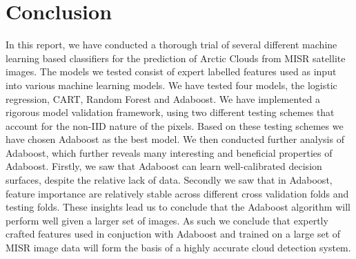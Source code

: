 \documentclass[11pt, letterpaper, journal]{IEEEtran}
\begin{document}
\section{Conclusion}
In this report, we have conducted a thorough trial of several different machine learning based classifiers for the prediction of Arctic Clouds from MISR satellite images. The models we tested consist of expert labelled features used as input into various machine learning models. We have tested four models, the logistic regression, CART, Random Forest and Adaboost. We have implemented a rigorous model validation framework, using two different testing schemes that account for the non-IID nature of the pixels. Based on these testing schemes we have chosen Adaboost as the best model. We then conducted further analysis of Adaboost, which further reveals many interesting and beneficial properties of Adaboost. Firstly, we saw that Adaboost can learn well-calibrated decision surfaces, despite the relative lack of data. Secondly we saw that in Adaboost, feature importance are relatively stable across different cross validation folds and testing folds. These insights lead us to conclude that the Adaboost algorithm will perform well given a larger set of images. As such we conclude that expertly crafted features used in conjuction with Adaboost and trained on a large set of MISR image data will form the basis of a highly accurate cloud detection system.
\end{document}
